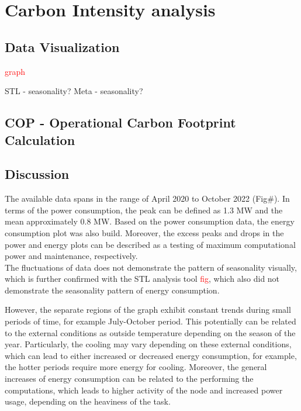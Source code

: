\section{Carbon Intensity analysis}
\noindent

\subsection{Data Visualization}
\textcolor{red}{graph}

STL - seasonality?
Meta - seasonality?

\subsection{COP - Operational Carbon Footprint Calculation}

\subsection{Discussion}
The available data spans in the range of April 2020 to October 2022 (Fig\#). In terms of the power consumption, the peak can be defined as 1.3 MW and the mean approximately 0.8 MW. Based on the power consumption data, the energy consumption plot was also build. Moreover, the excess peaks and drops in the power and energy plots can be described as a testing of maximum computational power and maintenance, respectively.  \\
The fluctuations of data does not demonstrate the pattern of seasonality visually, which is further confirmed with the STL analysis tool \textcolor{red}{fig}, which also did not demonstrate the seasonality pattern of energy consumption. 

However, the separate regions of the graph exhibit constant trends during small periods of time, for example July-October period. This potentially can be related to the external conditions as outside temperature depending on the season of the year. Particularly, the cooling may vary depending on these external conditions, which can lead to either increased or decreased energy consumption, for example, the hotter periods require more energy for cooling. Moreover, the general increases of energy consumption can be related to the performing the computations, which leads to higher activity of the node and increased power usage, depending on the heaviness of the task. 

